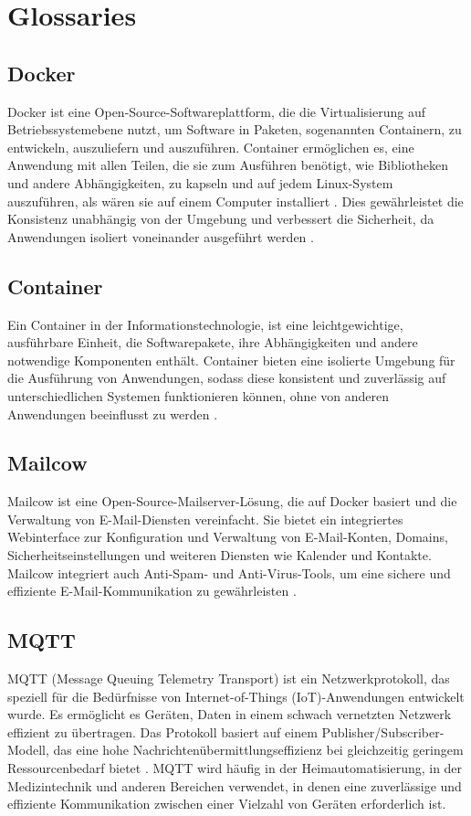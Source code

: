 \clearpage
\section{Glossaries}

\subsection{Docker}
\label{subsec:docker}
Docker ist eine Open-Source-Softwareplattform, die die Virtualisierung auf Betriebssystemebene nutzt, um Software in Paketen, sogenannten Containern, zu entwickeln, auszuliefern und auszuführen. Container ermöglichen es, eine Anwendung mit allen Teilen, die sie zum Ausführen benötigt, wie Bibliotheken und andere Abhängigkeiten, zu kapseln und auf jedem Linux-System auszuführen, als wären sie auf einem Computer installiert \cite{Aerisdocker} . Dies gewährleistet die Konsistenz unabhängig von der Umgebung und verbessert die Sicherheit, da Anwendungen isoliert voneinander ausgeführt werden \cite{Docker}.

\subsection{Container}
\label{subsec:container}
Ein Container in der Informationstechnologie, ist eine leichtgewichtige, ausführbare Einheit, die Softwarepakete, ihre Abhängigkeiten und andere notwendige Komponenten enthält. Container bieten eine isolierte Umgebung für die Ausführung von Anwendungen, sodass diese konsistent und zuverlässig auf unterschiedlichen Systemen funktionieren können, ohne von anderen Anwendungen beeinflusst zu werden \cite{Container}.

\subsection{Mailcow}
\label{subsec:mailcow}
Mailcow ist eine Open-Source-Mailserver-Lösung, die auf Docker basiert und die Verwaltung von E-Mail-Diensten vereinfacht. Sie bietet ein integriertes Webinterface zur Konfiguration und Verwaltung von E-Mail-Konten, Domains, Sicherheitseinstellungen und weiteren Diensten wie Kalender und Kontakte. Mailcow integriert auch Anti-Spam- und Anti-Virus-Tools, um eine sichere und effiziente E-Mail-Kommunikation zu gewährleisten \cite{Mailcow}.

\subsection{MQTT}
\label{subsec:mqtt}
MQTT (Message Queuing Telemetry Transport) ist ein Netzwerkprotokoll, das speziell für die Bedürfnisse von Internet-of-Things (IoT)-Anwendungen entwickelt wurde. Es ermöglicht es Geräten, Daten in einem schwach vernetzten Netzwerk effizient zu übertragen. Das Protokoll basiert auf einem Publisher/Subscriber-Modell, das eine hohe Nachrichtenübermittlungseffizienz bei gleichzeitig geringem Ressourcenbedarf bietet \cite{MQTT}. MQTT wird häufig in der Heimautomatisierung, in der Medizintechnik und anderen Bereichen verwendet, in denen eine zuverlässige und effiziente Kommunikation zwischen einer Vielzahl von Geräten erforderlich ist.

